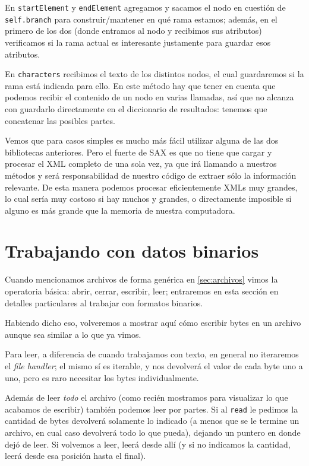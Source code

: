 En \texttt{startElement} y \texttt{endElement} agregamos y sacamos el nodo en cuestión de \texttt{self.branch} para construir/mantener en qué rama estamos; además, en el primero de los dos (donde entramos al nodo y recibimos sus atributos) verificamos si la rama actual es interesante justamente para guardar esos atributos.

En \texttt{characters} recibimos el texto de los distintos nodos, el cual guardaremos si la rama está indicada para ello. En este método hay que tener en cuenta que podemos recibir el contenido de un nodo en varias llamadas, así que no alcanza con guardarlo directamente en el diccionario de resultados: tenemos que concatenar las posibles partes.

Vemos que para casos simples es mucho más fácil utilizar alguna de las dos bibliotecas anteriores. Pero el fuerte de SAX es que no tiene que cargar y procesar el XML completo de una sola vez, ya que irá llamando a nuestros métodos y será responsabilidad de nuestro código de extraer sólo la información relevante. De esta manera podemos procesar eficientemente XMLs muy grandes, lo cual sería muy costoso si hay muchos y grandes, o directamente imposible si alguno es más grande que la memoria de nuestra computadora.


\section{Trabajando con datos binarios}

Cuando mencionamos archivos de forma genérica en \ref{sec:archivos} vimos la operatoria básica: abrir, cerrar, escribir, leer; entraremos en esta sección en detalles particulares al trabajar con formatos binarios.

Habiendo dicho eso, volveremos a mostrar aquí cómo escribir bytes en un archivo aunque sea similar a lo que ya vimos.


Para leer, a diferencia de cuando trabajamos con texto, en general no iteraremos el \textit{file handler}; el mismo sí es iterable, y nos devolverá el valor de cada byte uno a uno, pero es raro necesitar los bytes individualmente.

Además de leer \textit{todo} el archivo (como recién mostramos para visualizar lo que acabamos de escribir) también podemos leer por partes. Si al \texttt{read} le pedimos la cantidad de bytes devolverá solamente lo indicado (a menos que se le termine un archivo, en cual caso devolverá todo lo que pueda), dejando un puntero en donde dejó de leer. Si volvemos a leer, leerá desde allí (y si no indicamos la cantidad, leerá desde esa posición hasta el final).

